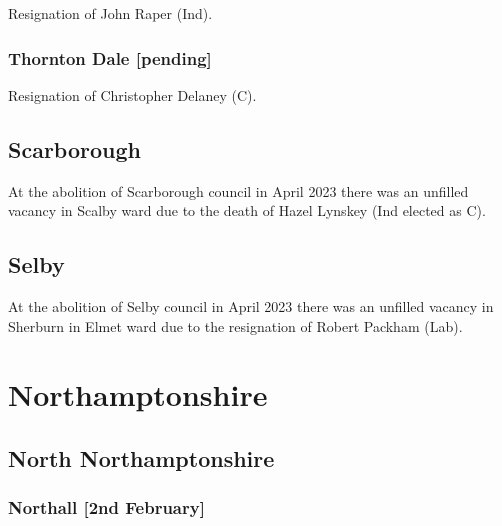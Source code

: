 \documentclass[a4paper,openany]{book}
\begin{document}
\begin{resultsiii}

Resignation of John Raper (Ind).

\subsubsection*{Thornton Dale \hspace*{\fill}\nolinebreak[1]%
	\enspace\hspace*{\fill}
	[pending]}


Resignation of Christopher Delaney (C).

\subsection*{Scarborough}

At the abolition of Scarborough council in April 2023 there was an unfilled vacancy in Scalby ward due to the death of Hazel Lynskey (Ind elected as C).%

\subsection*{Selby}

At the abolition of Selby council in April 2023 there was an unfilled vacancy in Sherburn in Elmet ward due to the resignation of Robert Packham (Lab).%

\section{Northamptonshire}

\subsection*{North Northamptonshire}

\subsubsection*{Northall \hspace*{\fill}\nolinebreak[1]%
	\enspace\hspace*{\fill}
	[2nd February]}



\end{resultsiii}
\end{document}
